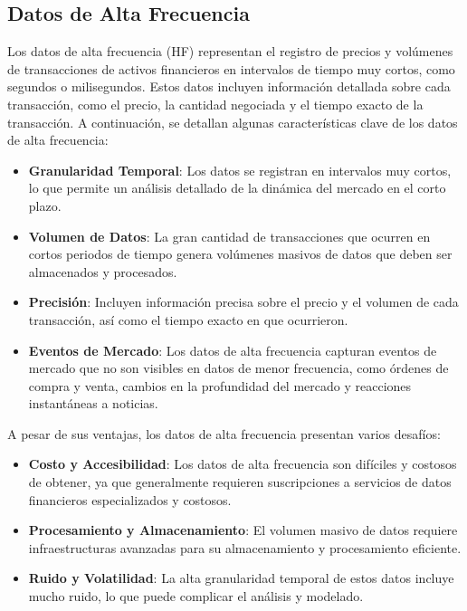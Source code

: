 \documentclass[a4paper,12pt]{report}
\begin{document}
\subsection{Datos de Alta Frecuencia}

Los datos de alta frecuencia (HF) representan el registro de precios y volúmenes de transacciones de activos financieros en intervalos 
de tiempo muy cortos, como segundos o milisegundos. Estos datos incluyen información detallada sobre cada transacción, como el precio, 
la cantidad negociada y el tiempo exacto de la transacción. A continuación, se detallan algunas características clave de los datos de 
alta frecuencia:

\begin{itemize}
    \item \textbf{Granularidad Temporal}: Los datos se registran en intervalos muy cortos, lo que permite un análisis detallado de la 
    dinámica del mercado en el corto plazo.
    \item \textbf{Volumen de Datos}: La gran cantidad de transacciones que ocurren en cortos periodos de tiempo genera volúmenes 
    masivos de datos que deben ser almacenados y procesados.
    \item \textbf{Precisión}: Incluyen información precisa sobre el precio y el volumen de cada transacción, así como el tiempo exacto 
    en que ocurrieron.
    \item \textbf{Eventos de Mercado}: Los datos de alta frecuencia capturan eventos de mercado que no son visibles en datos de menor 
    frecuencia, como órdenes de compra y venta, cambios en la profundidad del mercado y reacciones instantáneas a noticias.
\end{itemize}

A pesar de sus ventajas, los datos de alta frecuencia presentan varios desafíos:

\begin{itemize}
    \item \textbf{Costo y Accesibilidad}: Los datos de alta frecuencia son difíciles y costosos de obtener, ya que generalmente requieren 
    suscripciones a servicios de datos financieros especializados y costosos.
    \item \textbf{Procesamiento y Almacenamiento}: El volumen masivo de datos requiere infraestructuras avanzadas para su almacenamiento 
    y procesamiento eficiente.
    \item \textbf{Ruido y Volatilidad}: La alta granularidad temporal de estos datos incluye mucho ruido, lo que puede complicar el 
    análisis y modelado.
\end{itemize}
\end{document}
